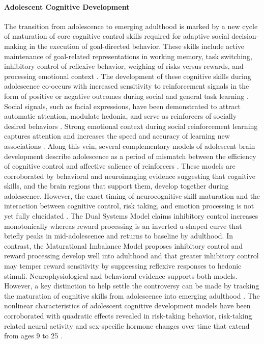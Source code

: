 \documentclass{article}%
\begin{document}
\paragraph*{Adolescent Cognitive Development}
The transition from adolescence to emerging adulthood is marked by a new cycle of maturation of core cognitive control skills required for adaptive social decision-making in the execution of goal-directed behavior. These skills include active maintenance of goal-related representations in working memory, task switching, inhibitory control of reflexive behavior, weighing of risks versus rewards, and processing emotional context \citep{luna2015}. 
The development of these cognitive skills during adolescence co-occurs with increased sensitivity to reinforcement signals in the form of positive or negative outcomes during social and general task learning \citep{jones2014adolescent, rosenbaum2020valence}. Social signals, such as facial expressions, have been demonstrated to attract automatic attention, modulate hedonia, and serve as reinforcers of socially desired behaviors \citep{teufel2009social,speer2007face}. Strong emotional context during social reinforcement learning captures attention and increases the speed and accuracy of learning new associations \citep{vernetti2017gaze,roper2014value}. Along this vein, several complementary models of adolescent brain development describe adolescence as a period of mismatch between the efficiency of cognitive control and affective salience of reinforcers \citep{CaseyEtAl2008, LunaWright2016}. These models are corroborated by behavioral and neuroimaging evidence suggesting that cognitive skills, and the brain regions that support them, develop together during adolescence.  However, the exact timing of neurocognitive skill maturation and the interaction between cognitive control, risk taking, and emotion processing is not yet fully elucidated \citep{shulman2016dual, duell2016interaction}. The Dual Systems Model claims inhibitory control increases monotonically whereas reward processing is an inverted u-shaped curve that briefly peaks in mid-adolescence and returns to baseline by adulthood. In contrast, the Maturational Imbalance Model proposes inhibitory control and reward processing develop well into adulthood and that greater inhibitory control may temper reward sensitivity by suppressing reflexive responses to hedonic stimuli. Neurophysiological and behavioral evidence supports both models. However, a key distinction to help settle the controversy can be made by tracking the maturation of cognitive skills from adolescence into emerging adulthood \citep{Steinberg2010,somerville2016searching}. The nonlinear characteristics of adolescent cognitive development models have been corroborated with quadratic effects revealed in  risk-taking behavior, risk-taking related neural activity and sex-specific hormone changes over time that extend from ages 9 to 25 \citep{braams2015longitudinal}.
%
\end{document}
